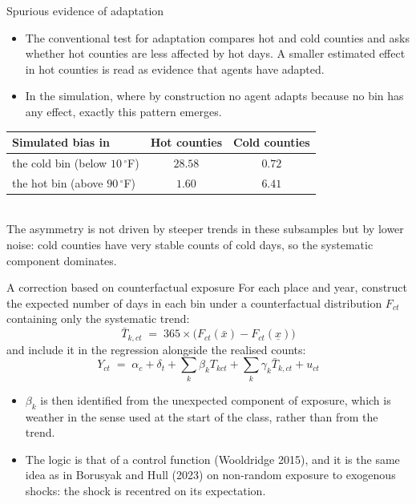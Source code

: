 \documentclass[aspectratio=169,10pt]{beamer}
\begin{document}
\begin{frame}{Spurious evidence of adaptation}
  \begin{itemize}
    \item The conventional test for adaptation compares hot and cold counties and asks
          whether hot counties are less affected by hot days. A smaller estimated
          effect in hot counties is read as evidence that agents have adapted.
    \item In the simulation, where by construction no agent adapts because no bin has
          any effect, exactly this pattern emerges.
  \end{itemize}
  \vspace{4pt}
  \centering
  \footnotesize
  \begin{tabular}{@{}lcc@{}}
    \toprule
    \textbf{Simulated bias in} & \textbf{Hot counties} & \textbf{Cold counties} \\
    \midrule
    the cold bin (below $10\,^\circ$F) & $28.58$ & $0.72$ \\
    the hot bin (above $90\,^\circ$F)  & $1.60$  & $6.41$ \\
    \bottomrule
  \end{tabular}
  \vspace{4pt}
  \\ \small The asymmetry is not driven by steeper trends in these subsamples but by
  lower noise: cold counties have very stable counts of cold days, so the systematic
  component dominates.
\end{frame}

\begin{frame}{A correction based on counterfactual exposure}
  \small
  For each place and year, construct the expected number of days in each bin under a
  counterfactual distribution $F_{ct}$ containing only the systematic trend:
  \[
    \bar T_{k,ct} \;=\; 365 \times \big(F_{ct}(\bar x) - F_{ct}(\underline{x})\big)
  \]
  and include it in the regression alongside the realised counts:
  \[
    Y_{ct} \;=\; \alpha_c + \delta_t
    + \sum_k \beta_k T_{kct}
    + \sum_k \gamma_k \bar T_{k,ct} + u_{ct}
  \]
  \begin{itemize}
    \item $\beta_k$ is then identified from the unexpected component of exposure,
          which is weather in the sense used at the start of the class, rather than
          from the trend.
    \item The logic is that of a control function (Wooldridge 2015), and it is the same
          idea as in Borusyak and Hull (2023) on non-random exposure to exogenous
          shocks: the shock is recentred on its expectation.
  \end{itemize}
\end{frame}
\end{document}
